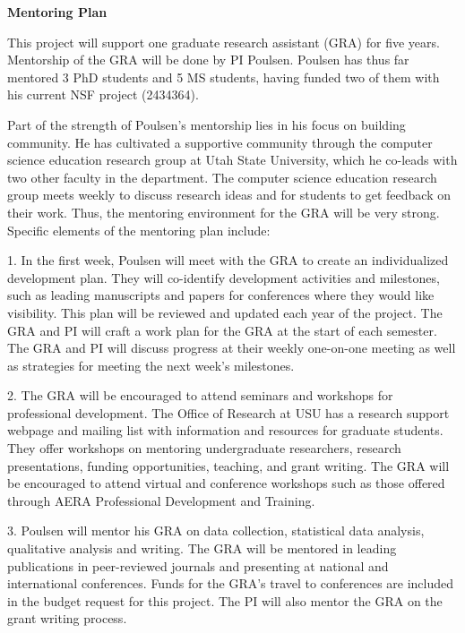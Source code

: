 \documentclass[12pt]{article}
\begin{document}
\textbf{Mentoring Plan}

This project will support one graduate research assistant (GRA) for five years. Mentorship of the GRA will be done by PI Poulsen. Poulsen has thus far mentored 3 PhD students and 5 MS students, having funded two of them with his current NSF project (2434364).

Part of the strength of Poulsen's mentorship lies in his focus on building community. He has cultivated a supportive community through the computer science education research group at Utah State University, which he co-leads with two other faculty in the department. The computer science education research group meets weekly to discuss research ideas and for students to get feedback on their work. Thus, the mentoring environment for the GRA will be very strong. Specific elements of the mentoring plan include:

1. In the first week, Poulsen will meet with the GRA to create an individualized development plan. They will co-identify development activities and milestones, such as leading manuscripts and papers for conferences where they would like visibility. This plan will be reviewed and updated each year of the project. The GRA and PI will craft a work plan for the GRA at the start of each semester. The GRA and PI will discuss progress at their weekly one-on-one meeting as well as strategies for meeting the next week's milestones.

2. The GRA will be encouraged to attend seminars and workshops for professional development. The Office of Research at USU has a research support webpage and mailing list with information and resources for graduate students. They offer workshops on mentoring undergraduate researchers, research presentations, funding opportunities, teaching, and grant writing. The GRA will be encouraged to attend virtual and conference workshops such as those offered through AERA Professional Development and Training.

3. Poulsen will mentor his GRA on data collection, statistical data analysis, qualitative analysis and writing. The GRA will be mentored in leading publications in peer-reviewed journals and presenting at national and international conferences. Funds for the GRA's travel to conferences are included in the budget request for this project. The PI will also mentor the GRA on the grant writing process.
\end{document}

